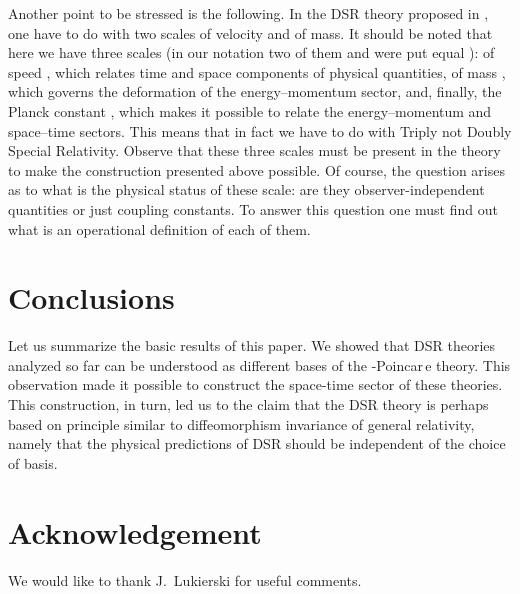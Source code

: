 \documentclass[a4paper,a4paper]{article}
\begin{document}
Another point to be stressed is the following. In the DSR theory
proposed in \cite{gac1}, \cite{gac2} one have to do with two
scales of velocity and of mass. It should be noted that here we
have three scales (in our notation two of them \coordHE{} and \myHighlight{$\hbar$}\coordHE{}
were put equal  \coordHE{}): of speed \coordHE{}, which relates time and space
components of physical quantities, of mass \myHighlight{$\kappa$}\coordHE{}, which governs
the deformation of the energy--momentum sector, and, finally, the
Planck constant \myHighlight{$\hbar$}\coordHE{}, which makes it possible to relate the
energy--momentum and space--time sectors. This means that in fact
we have to do with Triply not Doubly Special Relativity. Observe
that these three scales must be present in the theory to make the
construction presented above possible. Of course, the question
arises as to what is the physical status of these scale: are they
observer-independent quantities or just coupling constants. To
answer this question one must find out what is an operational
definition of each of them.




\section{Conclusions }

Let us summarize the basic results of this paper. We showed that
DSR theories analyzed so far can be understood as different bases
of the \myHighlight{$\kappa$}\coordHE{}-Poincar\,e theory. This observation made it
possible to construct the space-time sector of these theories.
This construction, in turn, led us to the claim that the DSR
theory is perhaps based on principle similar to diffeomorphism
invariance of general relativity, namely that the physical
predictions of DSR should be independent of the choice of basis.

\section*{Acknowledgement}

We would like to thank J.~Lukierski for useful comments.
\end{document}
